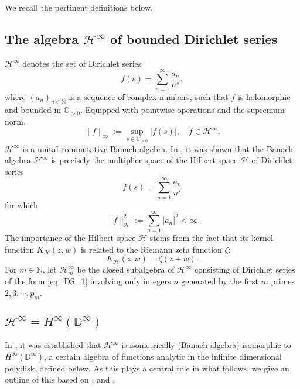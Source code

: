 \documentclass[11pt,reqno]{amsart}
\numberwithin{equation}{section}
\theoremstyle{definition}
\theoremstyle{definition}
\theoremstyle{definition}
\begin{document}
We recall the pertinent definitions below.

\subsection{The algebra ${{{\mathscr{H}}^{\infty}}}$ of bounded Dirichlet series} 

${{{\mathscr{H}}^{\infty}}}$ denotes the set of Dirichlet series
\begin{equation}
\label{eq_DS_1}
f(s)=\sum_{n=1}^\infty \frac{a_n}{n^s},
\end{equation}
where $(a_n)_{n\in {\mathbb{N}}}$ is a sequence of complex numbers, such that
$f$ is holomorphic and bounded in ${\mathbb{C}}_{\scriptscriptstyle >0}$. 
Equipped with pointwise operations and
the supremum norm,
$$
\|f\|_\infty:=\sup_{s\in {\mathbb{C}}_{\scriptscriptstyle >0}} |f(s)|, \quad f\in {{{\mathscr{H}}^{\infty}}},
$$
${{{\mathscr{H}}^{\infty}}}$ is a unital commutative Banach algebra.  In
\cite[Theorem~3.1]{HedLinSei}, it was shown that the Banach algebra
${{{\mathscr{H}}^{\infty}}}$ is precisely the multiplier space of the Hilbert space ${\mathcal{H}}$
of Dirichlet series 
$$
\displaystyle
f(s)=\sum_{n=1}^\infty\frac{a_n}{n^s} 
$$ 
for which
$$
\displaystyle \|f\|_{\mathcal{H}}^2:=\sum_{n=1}^\infty |a_n|^2<\infty.
$$
The importance of the Hilbert space ${\mathcal{H}}$ stems from the fact that
its kernel function $K_{\mathcal{H}}(z,w)$ is related to the Riemann zeta
function $\zeta$: 
$$
K_{\mathcal{H}}(z,w)=\zeta(z+\overline{w}).
$$
For $m\in {\mathbb{N}}$, let $\mathscr{H}^\infty_m$ be the closed subalgebra of
${{{\mathscr{H}}^{\infty}}}$ consisting of Dirichlet series of the form \eqref{eq_DS_1}
involving only integers $n$ generated by the first $m$ primes
$2,3,\cdots, p_m$.
 
\subsection{${{{\mathscr{H}}^{\infty}}}= H^\infty({\mathbb{D}}^\infty)$}

In \cite[Lemma~2.3 and the proof of Theorem~3.1]{HedLinSei}, it was
established that ${{{\mathscr{H}}^{\infty}}}$ is isometrically (Banach algebra) isomorphic to
$H^\infty({\mathbb{D}}^\infty )$, a certain algebra of functions analytic in
the infinite dimensional polydisk, defined below. As this plays a
central role in what follows, we give an outline of this based on
\cite{HedLinSei}, \cite{Sei} and \cite{MauQue}.
\end{document}
